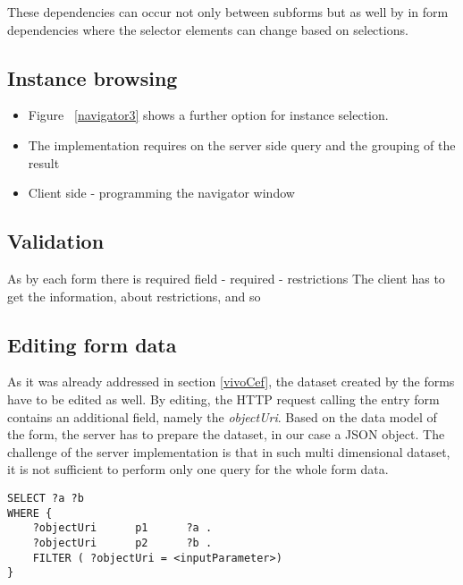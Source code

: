 
These dependencies can occur not only between subforms but as well by in form dependencies where the selector elements can change based on selections.

\subsection{Instance browsing}


\begin{itemize}
	\item Figure ~\ref{navigator3} shows a further option for instance selection. 
\end{itemize}


\begin{itemize}
	\item The implementation requires on the server side query and the grouping of the result
	\item Client side - programming the navigator window
\end{itemize}


\subsection{Validation}

As by each form there is required field - required - restrictions
The client has to get the information, about restrictions, and so  


\subsection{Editing form data}
	
As it was already addressed in section \ref{vivoCef}, the dataset created by the forms have to be edited as well. By editing, the HTTP request calling the entry form contains an additional field, namely the \textit{objectUri}. Based on the data model of the form, the server has to prepare the dataset, in our case a JSON object. The challenge of the server implementation is that in such multi dimensional dataset, it is not sufficient to perform only one query for the whole form data.


\begin{lstlisting}[captionpos=b, caption=SPARQL query for the form data, label={sparqlExisting},
basicstyle=\footnotesize,frame=single]
SELECT ?a ?b
WHERE {
	?objectUri		p1		?a .
	?objectUri		p2		?b .
	FILTER ( ?objectUri = <inputParameter>)
}
\end{lstlisting}

